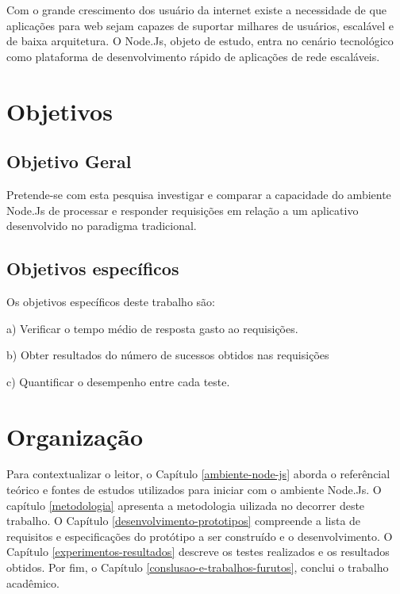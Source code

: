   Com o grande crescimento dos usuário da internet existe a necessidade de que aplicações para web sejam capazes de suportar milhares de usuários,
  escalável e de baixa arquitetura. O Node.Js, objeto de estudo, entra no cenário tecnológico como plataforma de desenvolvimento rápido
  de aplicações de rede escaláveis.
  
\section{Objetivos}
\label{objetivos}


\subsection{Objetivo Geral}

  Pretende-se com esta pesquisa investigar e comparar a capacidade 
  do ambiente Node.Js de processar e responder requisições em relação a um aplicativo desenvolvido 
  no paradigma tradicional.
 
  
\subsection{Objetivos específicos}

  Os objetivos específicos deste trabalho são:
  
    \begin{compactitem}
      \item[a)] Verificar o tempo médio de resposta gasto ao requisições.
      \item[b)] Obter resultados do número de sucessos obtidos nas requisições   
      \item[c)] Quantificar o desempenho entre cada teste.
    \end{compactitem}
  
  
\section{Organização}
\label{organizacao}  

  Para contextualizar o leitor, o Capítulo \ref{ambiente-node-js} aborda o referêncial teórico e fontes de estudos utilizados para iniciar com o ambiente 
  Node.Js. O capítulo \ref{metodologia} apresenta a metodologia uilizada no decorrer deste trabalho. O Capítulo \ref{desenvolvimento-prototipos} compreende a lista de requisitos e especificações do protótipo a ser construído e o
  desenvolvimento. O Capítulo \ref{experimentos-resultados} descreve os testes realizados e os resultados obtidos. 
  Por fim, o Capítulo \ref{conslusao-e-trabalhos-furutos}, conclui o trabalho acadêmico.
